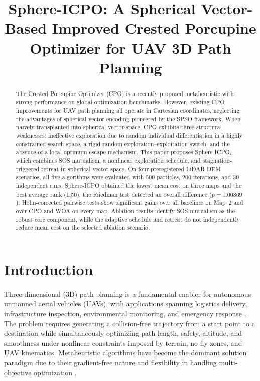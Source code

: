 \documentclass[11pt,a4paper]{article}
\title{Sphere-ICPO: A Spherical Vector-Based Improved Crested Porcupine Optimizer for UAV 3D Path Planning}
\author{}
\date{}
\begin{document}
\maketitle

\begin{abstract}
The Crested Porcupine Optimizer (CPO) is a recently proposed metaheuristic with strong performance on global optimization benchmarks. However, existing CPO improvements for UAV path planning all operate in Cartesian coordinates, neglecting the advantages of spherical vector encoding pioneered by the SPSO framework. When naively transplanted into spherical vector space, CPO exhibits three structural weaknesses: ineffective exploration due to random individual differentiation in a highly constrained search space, a rigid random exploration--exploitation switch, and the absence of a local-optimum escape mechanism. This paper proposes Sphere-ICPO, which combines SOS mutualism, a nonlinear exploration schedule, and stagnation-triggered retreat in spherical vector space. On four preregistered LiDAR DEM scenarios, all five algorithms were evaluated with 500 particles, 200 iterations, and 30 independent runs. Sphere-ICPO obtained the lowest mean cost on three maps and the best average rank (1.50); the Friedman test detected an overall difference ($p=0.00869$). Holm-corrected pairwise tests show significant gains over all baselines on Map~2 and over CPO and WOA on every map. Ablation results identify SOS mutualism as the robust core component, while the adaptive schedule and retreat do not independently reduce mean cost on the selected ablation scenario.
\end{abstract}

\section{Introduction}

Three-dimensional (3D) path planning is a fundamental enabler for autonomous unmanned aerial vehicles (UAVs), with applications spanning logistics delivery, infrastructure inspection, environmental monitoring, and emergency response \cite{icpo2024,qcpo2025,jayacpo2025}. The problem requires generating a collision-free trajectory from a start point to a destination while simultaneously optimizing path length, safety, altitude, and smoothness under nonlinear constraints imposed by terrain, no-fly zones, and UAV kinematics. Metaheuristic algorithms have become the dominant solution paradigm due to their gradient-free nature and flexibility in handling multi-objective optimization \cite{sps2021,cpo2024}.
\end{document}
